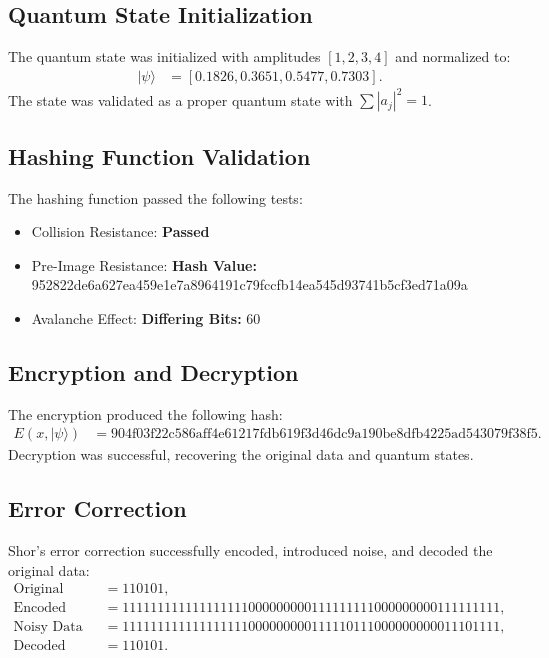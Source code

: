 \documentclass{article}
\theoremstyle{plain}
\begin{document}
\subsection{Quantum State Initialization}
The quantum state was initialized with amplitudes $[1, 2, 3, 4]$ and normalized to:
\begin{align*}
|\psi\rangle &= [0.1826, 0.3651, 0.5477, 0.7303].
\end{align*}
The state was validated as a proper quantum state with $\sum |a_j|^2 = 1$.

\subsection{Hashing Function Validation}
The hashing function passed the following tests:
\begin{itemize}
    \item Collision Resistance: \textbf{Passed}
    \item Pre-Image Resistance: \textbf{Hash Value:} 952822de6a627ea459e1e7a8964191c79fccfb14ea545d93741b5cf3ed71a09a
    \item Avalanche Effect: \textbf{Differing Bits:} 60
\end{itemize}

\subsection{Encryption and Decryption}
The encryption produced the following hash:
\begin{align*}
E(x, |\psi\rangle) &= \text{904f03f22c586aff4e61217fdb619f3d46dc9a190be8dfb4225ad543079f38f5}.
\end{align*}
Decryption was successful, recovering the original data and quantum states.

\subsection{Error Correction}
Shor's error correction successfully encoded, introduced noise, and decoded the original data:
\begin{align*}
\text{Original Data} &= 110101, \\
\text{Encoded Data} &= 111111111111111111000000000111111111000000000111111111, \\
\text{Noisy Data} &= 111111111111111111000000000111110111000000000011101111, \\
\text{Decoded Data} &= 110101.
\end{align*}
\end{document}
